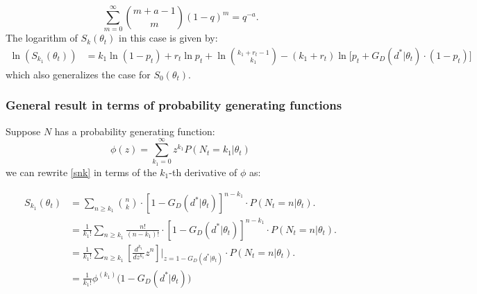 \documentclass{article}
\begin{document}
\begin{equation}
    \sum\limits_{m = 0}^{\infty} \binom{m + a - 1}{m} (1 - q)^m = q^{-a}.
\end{equation}
The logarithm of $S_k(\theta_t)$ in this case is given by:
\begin{equation}\label{negbinloglikelihood}
\begin{aligned}
\ln{\left(S_{k_1}(\theta_t)\right)} & = k_1 \ln{(1 - p_t)} + r_t \ln{p_t} + \ln{\binom{k_1 + r_t - 1}{k_1}} - (k_1 + r_t) \ln{\Big[p_t + G_D(d^*|\theta_t)\cdot (1 - p_t) \Big]}
\end{aligned}
\end{equation}
which also generalizes the case for $S_0(\theta_t)$. 

\subsubsection{General result in terms of probability generating functions}

Suppose $N$ has a probability generating function:
\begin{equation}
    \phi(z) = \sum\limits_{k_1 = 0}^{\infty}  z^{k_1} P(N_t = k_1 | \theta_t)
\end{equation}
we can rewrite \eqref{snk} in terms of the $k_1$-th derivative of $\phi$ as:

\begin{equation}
\begin{aligned}
    S_{k_1}(\theta_t) & = \sum\limits_{n \geq k_1} \binom{n}{k}   \cdot \left[1 - G_D(d^*|\theta_t)\right]^{n - k_1} \cdot P(N_t = n|\theta_t).
    \\ & = \frac{1}{k_1!} \sum\limits_{n \geq k_1} \frac{n!}{(n-k_1)!} \cdot \left[1 - G_D(d^*|\theta_t)\right]^{n - k_1} \cdot P(N_t = n|\theta_t).
    \\ & = \frac{1}{k_1!}  \sum\limits_{n \geq k_1} \left[\frac{d^{k_1}}{dz^{k_1}} z^n\right]\Bigg|_{z = 1 - G_D(d^*|\theta_t)} \cdot P(N_t = n|\theta_t).
    \\ & = \frac{1}{k_1!} \phi^{(k_1)}\big(1 - G_D(d^*|\theta_t)\big)
\end{aligned}    
\end{equation}

\end{document}

